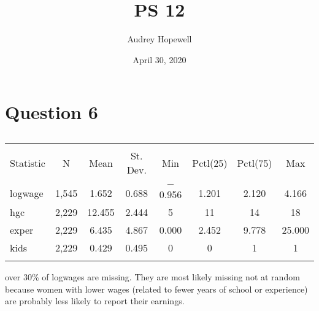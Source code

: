 \documentclass{article}
\title{PS 12}
\author{Audrey Hopewell }
\date{April 30, 2020}
\begin{document}
\maketitle

\section{Question 6}
\begin{table}[!htbp] \centering 
  \caption{} 
  \label{} 
\begin{tabular}{@{\extracolsep{2pt}}lccccccc} 
\\[-1.8ex]\hline 
\hline \\[-1.8ex] 
Statistic & \multicolumn{1}{c}{N} & \multicolumn{1}{c}{Mean} & \multicolumn{1}{c}{St. Dev.} & \multicolumn{1}{c}{Min} & \multicolumn{1}{c}{Pctl(25)} & \multicolumn{1}{c}{Pctl(75)} & \multicolumn{1}{c}{Max} \\ 
\hline \\[-1.8ex] 
logwage & 1,545 & 1.652 & 0.688 & $-$0.956 & 1.201 & 2.120 & 4.166 \\ 
hgc & 2,229 & 12.455 & 2.444 & 5 & 11 & 14 & 18 \\ 
exper & 2,229 & 6.435 & 4.867 & 0.000 & 2.452 & 9.778 & 25.000 \\ 
kids & 2,229 & 0.429 & 0.495 & 0 & 0 & 1 & 1 \\ 
\hline \\[-1.8ex] 
\end{tabular} 
\end{table} 

over 30\% of logwages are missing. They are most likely missing not at random because women with lower wages (related to fewer years of school or experience) are probably less likely to report their earnings.

\newpage
\end{document}
